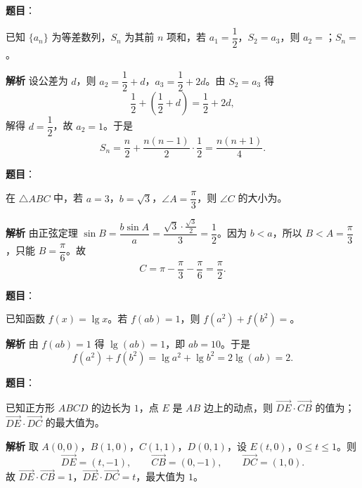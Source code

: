 \begin{answer}

\textbf{题目}：

已知 $\{a_n\}$ 为等差数列，$S_n$ 为其前 $n$ 项和，若 $a_1=\dfrac12$，$S_2=a_3$，则 $a_2=$\gkblank{}；$S_n=$\gkblank{}。

\textbf{解析}
设公差为 $d$，则 $a_2=\dfrac12+d$，$a_3=\dfrac12+2d$。由 $S_2=a_3$ 得
\nopagebreak[4]
\[\frac12+\left(\frac12+d\right)=\frac12+2d,\]
解得 $d=\dfrac12$，故 $a_2=1$。于是
\nopagebreak[4]
\[S_n=\frac n2+\frac{n(n-1)}2\cdot\frac12=\frac{n(n+1)}4.\]


\end{answer}
\begin{answer}

\textbf{题目}：

在 $\triangle ABC$ 中，若 $a=3$，$b=\sqrt3$，$\angle A=\dfrac\pi3$，则 $\angle C$ 的大小为\gkblank{}。

\textbf{解析}
由正弦定理 $\sin B=\dfrac{b\sin A}{a}=\dfrac{\sqrt3\cdot\frac{\sqrt3}2}{3}=\dfrac12$。因为 $b<a$，所以 $B<A=\dfrac\pi3$，只能 $B=\dfrac\pi6$。故
\nopagebreak[4]
\[C=\pi-\frac\pi3-\frac\pi6=\frac\pi2.\]


\end{answer}
\begin{answer}

\textbf{题目}：

已知函数 $f(x)=\lg x$。若 $f(ab)=1$，则 $f(a^2)+f(b^2)=$\gkblank{}。

\textbf{解析}
由 $f(ab)=1$ 得 $\lg(ab)=1$，即 $ab=10$。于是
\nopagebreak[4]
\[f(a^2)+f(b^2)=\lg a^2+\lg b^2=2\lg(ab)=2.\]


\end{answer}
\begin{answer}

\textbf{题目}：

已知正方形 $ABCD$ 的边长为 $1$，点 $E$ 是 $AB$ 边上的动点，则 $\overrightarrow{DE}\cdot\overrightarrow{CB}$ 的值为\gkblank{}；$\overrightarrow{DE}\cdot\overrightarrow{DC}$ 的最大值为\gkblank{}。

\textbf{解析}
取 $A(0,0)$，$B(1,0)$，$C(1,1)$，$D(0,1)$，设 $E(t,0)$，$0\leqslant t\leqslant1$。则
\nopagebreak[4]
\[\overrightarrow{DE}=(t,-1),\qquad \overrightarrow{CB}=(0,-1),\qquad \overrightarrow{DC}=(1,0).\]
故 $\overrightarrow{DE}\cdot\overrightarrow{CB}=1$，$\overrightarrow{DE}\cdot\overrightarrow{DC}=t$，最大值为 $1$。


\end{answer}
